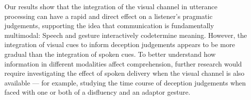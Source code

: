 \documentclass[a4paper,man,natbib]{apa6}
\begin{document}
Our results show that the integration of the visual channel in utterance processing can have a rapid and direct effect on a listener's pragmatic judgements, supporting the idea that communication is fundamentally multimodal: 
Speech and gesture interactively codetermine meaning.
However, the integration of visual cues to inform deception judgements appears to be more gradual than the integration of spoken cues.
To better understand how information in different modalities affect comprehension, further research would require investigating the effect of spoken delivery when the visual channel is also available --- for example, studying the time course of deception judgements when faced with one or both of a disfluency and an adaptor gesture.



\end{document}
